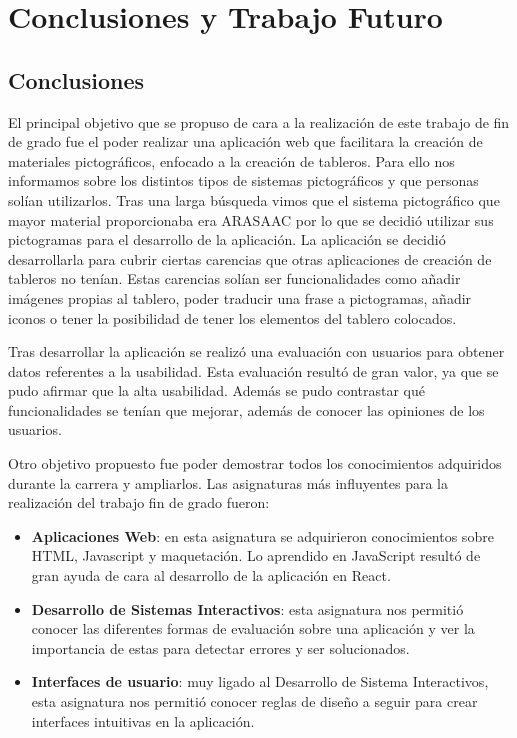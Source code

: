 \chapter{Conclusiones y Trabajo Futuro}
\label{cap:conclusiones}

\section{Conclusiones}


El principal objetivo que se propuso de cara a la realización de este trabajo de fin de grado fue el poder realizar una aplicación web que facilitara la creación de materiales pictográficos, enfocado a la creación de tableros. Para ello nos informamos sobre los distintos tipos de sistemas pictográficos y que personas solían utilizarlos. Tras una larga búsqueda vimos que el sistema pictográfico que mayor material proporcionaba era ARASAAC por lo que se decidió utilizar sus pictogramas para el desarrollo de la aplicación. La aplicación se decidió desarrollarla para cubrir ciertas carencias que otras aplicaciones de creación de tableros no tenían. Estas carencias solían ser funcionalidades como añadir imágenes propias al tablero, poder traducir una frase a pictogramas, añadir iconos o tener la posibilidad de tener los elementos del tablero colocados. 

Tras desarrollar la aplicación se realizó una evaluación con usuarios para obtener datos referentes a la usabilidad. Esta evaluación resultó de gran valor, ya que se pudo afirmar que la alta usabilidad. Además se pudo contrastar qué funcionalidades se tenían que mejorar, además de conocer las opiniones de los usuarios.


Otro objetivo propuesto fue poder demostrar todos los conocimientos adquiridos durante la carrera y ampliarlos. Las asignaturas más influyentes para la realización del trabajo fin de grado fueron:

\begin{itemize}
	\item \textbf{Aplicaciones Web}: en esta asignatura se adquirieron conocimientos sobre HTML, Javascript y maquetación. Lo aprendido en JavaScript resultó de gran ayuda de cara al desarrollo de la aplicación en React. 
	
	\item\textbf{ Desarrollo de Sistemas Interactivos}: esta asignatura nos permitió conocer las diferentes formas de evaluación sobre una aplicación y ver la importancia de estas para detectar errores y ser solucionados.
	
	\item \textbf{Interfaces de usuario}: muy ligado al Desarrollo de Sistema Interactivos, esta asignatura nos permitió conocer reglas de diseño a seguir para crear interfaces intuitivas en la aplicación.
	
\end{itemize}



